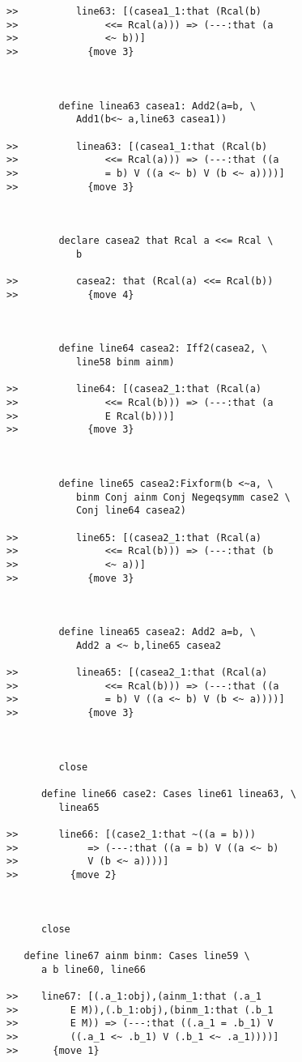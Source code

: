 \documentclass[12pt]{article}
\begin{document}
\begin{verbatim}
>>          line63: [(casea1_1:that (Rcal(b)
>>               <<= Rcal(a))) => (---:that (a
>>               <~ b))]
>>            {move 3}



         define linea63 casea1: Add2(a=b, \
            Add1(b<~ a,line63 casea1))

>>          linea63: [(casea1_1:that (Rcal(b)
>>               <<= Rcal(a))) => (---:that ((a
>>               = b) V ((a <~ b) V (b <~ a))))]
>>            {move 3}



         declare casea2 that Rcal a <<= Rcal \
            b

>>          casea2: that (Rcal(a) <<= Rcal(b))
>>            {move 4}



         define line64 casea2: Iff2(casea2, \
            line58 binm ainm)

>>          line64: [(casea2_1:that (Rcal(a)
>>               <<= Rcal(b))) => (---:that (a
>>               E Rcal(b)))]
>>            {move 3}



         define line65 casea2:Fixform(b <~a, \
            binm Conj ainm Conj Negeqsymm case2 \
            Conj line64 casea2)

>>          line65: [(casea2_1:that (Rcal(a)
>>               <<= Rcal(b))) => (---:that (b
>>               <~ a))]
>>            {move 3}



         define linea65 casea2: Add2 a=b, \
            Add2 a <~ b,line65 casea2

>>          linea65: [(casea2_1:that (Rcal(a)
>>               <<= Rcal(b))) => (---:that ((a
>>               = b) V ((a <~ b) V (b <~ a))))]
>>            {move 3}



         close

      define line66 case2: Cases line61 linea63, \
         linea65

>>       line66: [(case2_1:that ~((a = b)))
>>            => (---:that ((a = b) V ((a <~ b)
>>            V (b <~ a))))]
>>         {move 2}



      close

   define line67 ainm binm: Cases line59 \
      a b line60, line66

>>    line67: [(.a_1:obj),(ainm_1:that (.a_1
>>         E M)),(.b_1:obj),(binm_1:that (.b_1
>>         E M)) => (---:that ((.a_1 = .b_1) V
>>         ((.a_1 <~ .b_1) V (.b_1 <~ .a_1))))]
>>      {move 1}




\end{verbatim}
\end{document}
